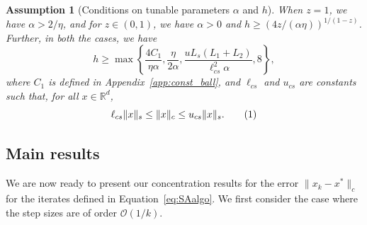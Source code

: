 \documentclass{article}
\newcommand{\numberthis}{\addtocounter{equation}{1}\tag{\theequation}}
\newcommand{\lrset}[1]{\left\{ #1 \right\}}
\newcommand{\lrp}[1]{\left( #1 \right)}
\newcommand{\R}{\mathbb{R}}
\newcommand{\lcs}{\ell_{cs}}
\newcommand{\ucs}{u_{cs}}
\newtheorem{assmp}{Assumption}
\begin{document}
\begin{assmp}[Conditions on tunable parameters $\alpha$ and $h$]\label{assmp:stepsize} When $z=1$, we have $\alpha> {2}/{\eta}$, and for $z\in (0,1)$, we have $\alpha > 0$ and $h\ge \lrp{{4z}/({\alpha \eta})}^{1/(1-z)}$. Further, in both the cases, we have 
\[ h \geq \max\lrset{ \frac{4 C_1}{\eta\alpha}, \frac{\eta}{2\alpha}, \frac{u L_s (L_1 + L_2)}{\lcs^2\alpha}, 8 }, \]
where $C_1$ is defined in Appendix~\ref{app:const_ball}, and $\lcs$ and $\ucs$ are constants such that, for all $x\in\R^d$,
\[ \lcs \|x\|_s \le \|x\|_c \le \ucs \|x\|_s. \numberthis\label{eq:normequiv} \] 
\end{assmp}






\subsection{Main results}
We are now ready to present our concentration results for the error $\|x_k-x^*\|_c$ for the iterates defined in Equation~\eqref{eq:SAalgo}. We first consider the case where the step sizes are of order $\mathcal{O}(1/k)$.
\end{document}
